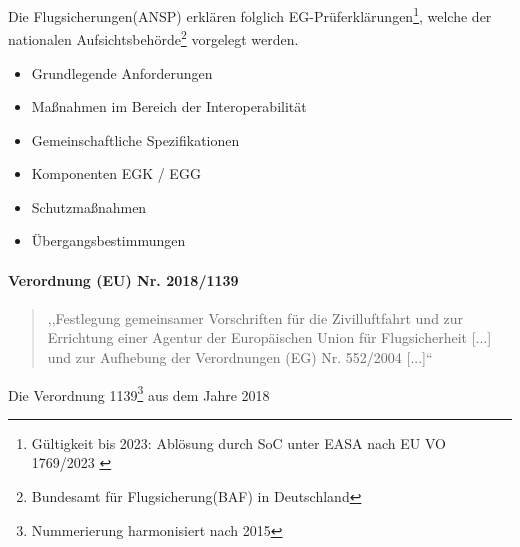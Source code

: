 Die Flugsicherungen(ANSP) erklären folglich EG-Prüferklärungen\footnote{Gültigkeit bis 2023: Ablösung durch SoC unter EASA nach EU VO 1769/2023 \cite{2023R1769}}, welche der nationalen Aufsichtsbehörde\footnote{Bundesamt für Flugsicherung(BAF) in Deutschland} vorgelegt werden. \cite[Art. 6 Abs. 1f]{2004R0552}


    \begin{itemize}
        \item Grundlegende Anforderungen
        \item Maßnahmen im Bereich der Interoperabilität
        \item Gemeinschaftliche Spezifikationen
        \item Komponenten EGK / EGG
        \item Schutzmaßnahmen
        \item Übergangsbestimmungen
    \end{itemize}

\paragraph{Verordnung (EU) Nr. 2018/1139}

\begin{quote}
    ,,Festlegung gemeinsamer Vorschriften für die Zivilluftfahrt und zur Errichtung einer Agentur der Europäischen Union für Flugsicherheit [...] und zur Aufhebung der Verordnungen (EG) Nr. 552/2004 [...]`` \cite{2018R1139} 
\end{quote}

Die Verordnung 1139\footnote{Nummerierung harmonisiert nach 2015\cite{eu_number_harmony}} aus dem Jahre 2018 


    \pagebreak
